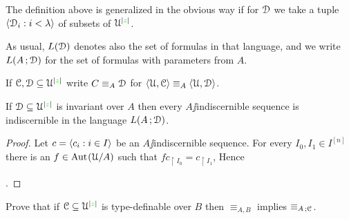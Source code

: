 \documentclass[creche.tex]{subfiles}
\begin{document}
The definition above is generalized in the obvious way if for $\EuScript D$ we take a tuple $\langle\EuScript D_i:i<\lambda\rangle$ of subsets of $\EuScript U^{|{\color{green} z}|}$.

As usual, $L(\EuScript D)$ denotes also the set of formulas in that language, and we write  $L(A\,;\EuScript D)$ for the set of formulas with parameters from $A$.

If  $\EuScript C,\EuScript D\subseteq\EuScript U^{|{\color{green} z}|}$ write $C\equiv_A\EuScript D$ for $\langle\EuScript U,\EuScript C\rangle\equiv_A\langle\EuScript U,\EuScript D\rangle$.


\begin{proposition}\label{prop_indiscernible_L(A,D)}
If $\EuScript D\subseteq\EuScript U^{|{\color{green} z}|}$ is invariant over $A$ then every $A\jj$indiscernible sequence is indiscernible in the language $L(A\,;\EuScript D)$.
\end{proposition}

\begin{proof}
Let $c=\langle c_i:i\in I\rangle$ be an $A\jj$indiscernible sequence. For every $I_0,I_1\in I^{[n]}$ there is an $f\in\textrm{Aut\kern.15ex}(\EuScript U/A)$ such that $fc_{\restriction I_0}=c_{\restriction I_1}$, Hence 

.
\end{proof}



\begin{exercise}
Prove that if $\EuScript C\subseteq\EuScript U^{|{\color{green} z}|}$ is type-definable over $B$ then $\equiv_{A,B}$ implies $\equiv_{A\,;\EuScript C}$.\QED
\end{exercise} 
\end{document}
